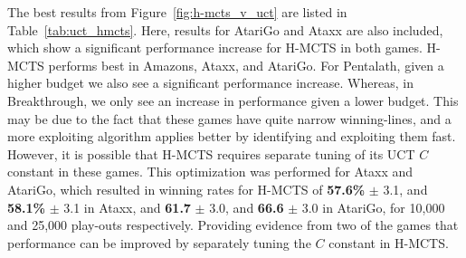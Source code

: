 \documentclass{kecsmstr}
\begin{document}
\begin{table}[ht]
\centering
\tabcolsep=0.3cm
\vspace{3mm}
{\caption{H-MCTS vs. UCT with random play-outs, 1,000 games.} \label{tab:uct_hmcts}}
\end{table}

The best results from Figure~\ref{fig:h-mcts_v_uct} are listed in Table~\ref{tab:uct_hmcts}. Here, results for AtariGo and Ataxx are also included, which show a significant performance increase for H-MCTS in both games. H-MCTS performs best in Amazons, Ataxx, and AtariGo. For Pentalath, given a higher budget we also see a significant performance increase. Whereas, in Breakthrough, we only see an increase in performance given a lower budget. This may be due to the fact that these games have quite narrow winning-lines, and a more exploiting algorithm applies better by identifying and exploiting them fast.
However, it is possible that H-MCTS requires separate tuning of its UCT $C$ constant in these games. This optimization was performed for Ataxx and AtariGo, which resulted in winning rates for H-MCTS of {\bf{57.6\%}} $\pm$ 3.1, and {\bf{58.1\%}} $\pm$ 3.1 in Ataxx, and {\bf{61.7}} $\pm$ 3.0, and {\bf{66.6}} $\pm$ 3.0 in AtariGo, for 10,000 and 25,000 play-outs respectively. Providing evidence from two  of the games that performance can be improved by separately tuning the $C$ constant in H-MCTS.
\end{document}
